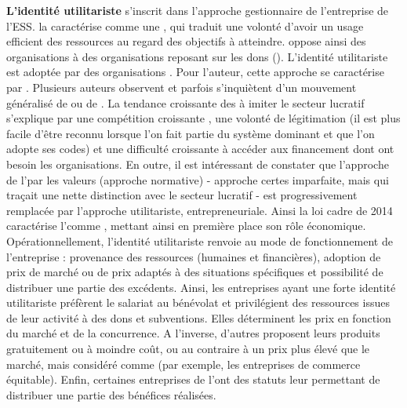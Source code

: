        \textbf{L'identité utilitariste} s'inscrit dans l'approche gestionnaire de l'entreprise de l'ESS. \textcite{young2001organizational} la caractérise comme une , qui traduit une volonté d'avoir un usage efficient des ressources au regard des objectifs à atteindre. \textcite[][p.840]{hansmann1980role} oppose ainsi des organisations  à des organisations reposant sur les dons ().
       L'identité utilitariste est adoptée par des organisations  \parencite[][p. 414]{dart2004being}. Pour l'auteur, cette approche se caractérise par  \parencite{dart2004legitimacy, mariaux2018leconomie}. Plusieurs auteurs observent et parfois s'inquiètent d'un mouvement généralisé de  ou de .  La tendance croissante des \eess à imiter le secteur lucratif \parencite{bidet2003insoutenable, valeau2013fonction} s'explique par une compétition croissante \parencite{dart2004being, frumkin2000when}, une volonté de légitimation (il est plus facile d'être reconnu lorsque l'on fait partie du système dominant et que l'on adopte ses codes) et une difficulté croissante à accéder aux financement dont ont besoin les organisations. En outre, il est intéressant de constater que l'approche de l'\ess par les valeurs (approche normative) - approche certes imparfaite, mais qui traçait une nette distinction avec le secteur lucratif - est progressivement remplacée par l'approche utilitariste, entrepreneuriale. Ainsi la loi cadre de 2014 caractérise l'\ess comme  \parencite{noauthor2014loi}, mettant ainsi en première place son rôle économique. \\

       Opérationnellement, l'identité utilitariste renvoie au mode de fonctionnement de l’entreprise : provenance des ressources (humaines et financières), adoption de prix de marché ou de prix adaptés à des situations spécifiques et possibilité de distribuer une partie des excédents. Ainsi, les entreprises ayant une forte identité utilitariste préfèrent le salariat au bénévolat et privilégient des ressources issues de leur activité à des dons et subventions. Elles déterminent les prix en fonction du marché et de la concurrence. A l'inverse, d'autres \oess proposent leurs produits gratuitement ou à moindre coût, ou au contraire à un prix plus élevé que le marché, mais considéré comme  (par exemple, les entreprises de commerce équitable). Enfin, certaines entreprises de l’\ess ont des statuts leur permettant de distribuer une partie des bénéfices réalisées. \\

